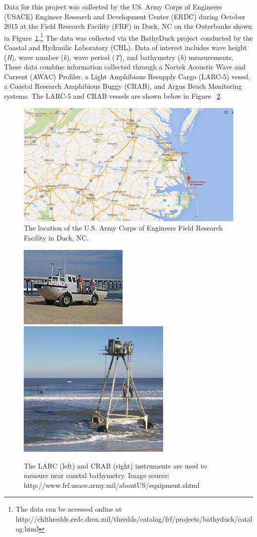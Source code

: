 Data for this project was collected by the US. Army Corps of Engineers (USACE) Engineer Research and Development Center (ERDC) during October 2015 at the Field Research Facility (FRF) in Duck, NC on the Outerbanks shown in Figure~\ref{FRFmap}.\footnote{The data can be accessed online at http://chlthredds.erdc.dren.mil/thredds/catalog/frf/projects/bathyduck/catalog.html} The data was collected via the BathyDuck project conducted by the Coastal and Hydraulic Laboratory (CHL). Data of interest includes wave height (\textit{H}), wave number (\textit{k}), wave period (\textit{T}), and bathymetry (\textit{h}) measurements. These data combine information collected through a Nortek Acoustic Wave and Current (AWAC) Profiler, a Light Amphibious Resupply Cargo (LARC-5) vessel, a Coastal Research Amphibious Buggy (CRAB), and Argus Beach Monitoring systems. The LARC-5 and CRAB vessels are shown below in Figure ~\ref{crablarc}.

\begin{figure}[h]
\centering
\includegraphics[width=.48\linewidth]{img/FRF_map.png}
\caption{The location of the U.S. Army Corps of Engineers Field Research Facility in Duck, NC.}
\label{FRFmap}
\end{figure}

\begin{figure}[h]
\includegraphics[width=.48\linewidth]{img/LARC.jpg}\hfill
\includegraphics[width=.48\linewidth]{img/CRAB2.JPG}
\caption{The LARC (left) and CRAB (right) instruments are used to measure near coastal bathymetry. Image source: http://www.frf.usace.army.mil/aboutUS/equipment.shtml}
\label{crablarc}
\end{figure}


